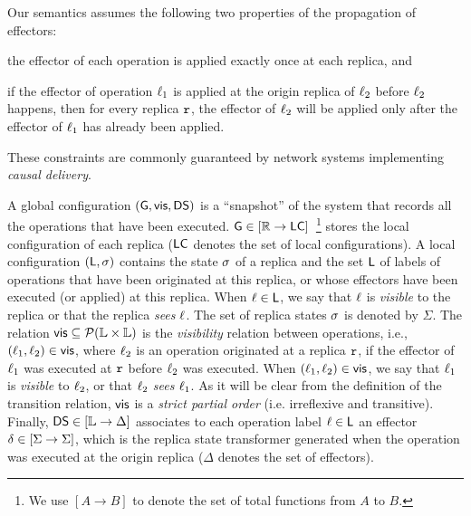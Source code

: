 Our semantics assumes the following two
properties of the propagation of effectors:
\begin{inparaenum}[(i)]
\item the effector of each operation is applied exactly once at
  each replica, and
\item if the effector of operation $\ell_1$ is applied at the
  origin replica of $\ell_2$ before $\ell_2$ happens, then for every
  replica $\mathtt{r}$, the effector of $\ell_2$ will be applied only
  after the effector of $\ell_1$ has already been applied.
\end{inparaenum}
These constraints are commonly guaranteed by network systems
implementing \emph{causal delivery}.

A global configuration $(\mathsf{G}, \mathsf{vis}, \mathsf{DS})$ is a
``snapshot'' of the system that records all the operations that have
been executed.
$\mathsf{G} \in [\mathbb{R} \rightarrow \mathsf{LC}]$~\footnote{We use $[A\rightarrow B]$ to denote the set of total functions from
  $A$ to $B$.} stores the local
configuration of each replica ($\mathsf{LC}$ denotes the set of local configurations).
A local configuration $(\mathsf{L}, \sigma)$ contains the state
$\sigma$ of a replica and the set $\mathsf{L}$ of labels of
operations that have been originated at this replica, or whose
effectors have been executed (or applied) at this replica.
When $\ell\in \mathsf{L}$, we say that $\ell$ is \emph{visible}
to the replica or that the replica \emph{sees} $\ell$. 
The set of replica states $\sigma$ is denoted by $\Sigma$.
The relation $\mathsf{vis}\subseteq \mathcal{P}(\mathbb{L} \times \mathbb{L})$ is
the \emph{visibility} relation between operations, i.e.,
$(\ell_1,\ell_2)\in \mathsf{vis}$, where $\ell_2$ is an operation
originated at a replica $\mathtt{r}$, if the effector of $\ell_1$ was
executed at $\mathtt{r}$ before $\ell_2$ was executed.
When $(\ell_1,\ell_2)\in \mathsf{vis}$, we say that $\ell_1$ is
\emph{visible} to $\ell_2$, or that $\ell_2$ \emph{sees}
$\ell_1$.
As it will be clear from the definition of the transition relation,
$\mathsf{vis}$ is a \emph{strict partial order} (i.e.
irreflexive and transitive).
Finally, $\mathsf{DS}\in [\mathbb{L} \rightarrow \Delta]$ associates to
each operation label $\ell \in \mathsf{L}$ an effector
$\delta\in [\Sigma \rightarrow \Sigma]$, which is the replica
state transformer generated when the operation was executed at the
origin replica ($\Delta$ denotes the set of effectors).

